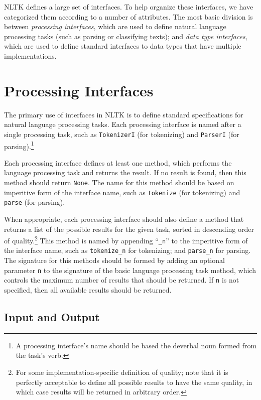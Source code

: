 \documentclass[11pt]{article}
\begin{document}
NLTK defines a large set of interfaces.  To help organize these
interfaces, we have categorized them according to a number of
attributes.  The most basic division is between \textit{processing
  interfaces}, which are used to define natural language processing
tasks (such as parsing or classifying texts); and \textit{data type
  interfaces}, which are used to define standard interfaces to data
types that have multiple implementations.

\section{Processing Interfaces}

The primary use of interfaces in NLTK is to define standard
specifications for natural language processing tasks.  Each processing
interface is named after a single processing task, such as
\texttt{TokenizerI} (for tokenizing) and \texttt{ParserI} (for
parsing).\footnote{A processing interface's name should be based the
  deverbal noun formed from the task's verb.}

Each processing interface defines at least one method, which performs
the language processing task and returns the result.  If no result is
found, then this method should return \texttt{None}.  The name for
this method should be based on imperitive form of the interface name,
such as \texttt{tokenize} (for tokenizing) and \texttt{parse} (for
parsing).

When appropriate, each processing interface should also define a
method that returns a list of the possible results for the given task,
sorted in descending order of quality.\footnote{For some
  implementation-specific definition of quality; note that it is
  perfectly acceptable to define all possible results to have the same
  quality, in which case results will be returned in arbitrary order.}
This method is named by appending ``\texttt{\_n}'' to the imperitive
form of the interface name, such as \texttt{tokenize\_n} for
tokenizing; and \texttt{parse\_n} for parsing.  The signature for this
methods should be formed by adding an optional parameter \texttt{n} to
the signature of the basic language processing task method, which
controls the maximum number of results that should be returned.  If
\texttt{n} is not specified, then all available results should be
returned.

\subsection{Input and Output}
\end{document}
